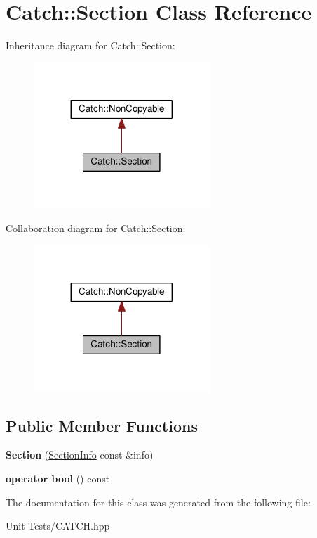 \hypertarget{classCatch_1_1Section}{}\section{Catch\+:\+:Section Class Reference}
\label{classCatch_1_1Section}


Inheritance diagram for Catch\+:\+:Section\+:
\nopagebreak
\begin{figure}[H]
\begin{center}
\leavevmode
\includegraphics[width=188pt]{classCatch_1_1Section__inherit__graph}
\end{center}
\end{figure}


Collaboration diagram for Catch\+:\+:Section\+:
\nopagebreak
\begin{figure}[H]
\begin{center}
\leavevmode
\includegraphics[width=188pt]{classCatch_1_1Section__coll__graph}
\end{center}
\end{figure}
\subsection*{Public Member Functions}
\begin{DoxyCompactItemize}
\item 
{\bfseries Section} (\hyperlink{structCatch_1_1SectionInfo}{Section\+Info} const \&info)\hypertarget{classCatch_1_1Section_a68fd4e51e8981aaa7ddb00d8a6abd099}{}\label{classCatch_1_1Section_a68fd4e51e8981aaa7ddb00d8a6abd099}

\item 
{\bfseries operator bool} () const \hypertarget{classCatch_1_1Section_a6c9be48e8ba0611c4aa601102e706f3b}{}\label{classCatch_1_1Section_a6c9be48e8ba0611c4aa601102e706f3b}

\end{DoxyCompactItemize}


The documentation for this class was generated from the following file\+:\begin{DoxyCompactItemize}
\item 
Unit Tests/C\+A\+T\+C\+H.\+hpp\end{DoxyCompactItemize}
